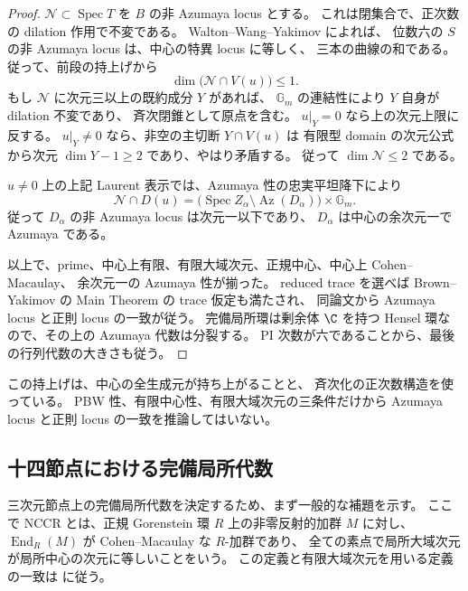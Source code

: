 \begin{proof}
$\mathcal N\subset\operatorname{Spec}T$ を $B$ の非 Azumaya locus とする。
これは閉集合で、正次数の dilation 作用で不変である。
Walton--Wang--Yakimov
\cite[Theorem~1.3(1), Lemma~5.4]{CMOWaltonWangYakimov}によれば、
位数六の $S$ の非 Azumaya locus は、中心の特異 locus に等しく、
三本の曲線の和である。従って、前段の持上げから
\[
 \dim\bigl(\mathcal N\cap V(u)\bigr)\leq1.
\]
もし $\mathcal N$ に次元三以上の既約成分 $Y$ があれば、
$\mathbb G_m$ の連結性により $Y$ 自身が dilation 不変であり、
斉次閉錐として原点を含む。
$u|_Y=0$ なら上の次元上限に反する。
$u|_Y\ne0$ なら、非空の主切断 $Y\cap V(u)$ は
有限型 domain の次元公式から次元 $\dim Y-1\geq2$ であり、やはり矛盾する。
従って $\dim\mathcal N\leq2$ である。

$u\ne0$ 上の上記 Laurent 表示では、Azumaya 性の忠実平坦降下により
\[
 \mathcal N\cap D(u)=
       \bigl(\operatorname{Spec}Z_\alpha\setminus
                     \operatorname{Az}(D_\alpha)\bigr)\times\mathbb G_m.
\]
従って $D_\alpha$ の非 Azumaya locus は次元一以下であり、
$D_\alpha$ は中心の余次元一で Azumaya である。

以上で、prime、中心上有限、有限大域次元、正規中心、中心上 Cohen--Macaulay、
余次元一の Azumaya 性が揃った。
reduced trace を選べば Brown--Yakimov の Main Theorem の trace 仮定も満たされ、
同論文\cite[Corollary~5.2]{CMOBrownYakimov}から
Azumaya locus と正則 locus の一致が従う。
完備局所環は剰余体 $\C$ を持つ Hensel 環なので、その上の Azumaya 代数は分裂する。
PI 次数が六であることから、最後の行列代数の大きさも従う。
\end{proof}

\begin{remark}
この持上げは、中心の全生成元が持ち上がることと、
斉次化の正次数構造を使っている。
PBW 性、有限中心性、有限大域次元の三条件だけから
Azumaya locus と正則 locus の一致を推論してはいない。
\end{remark}


\subsection{十四節点における完備局所代数}

三次元節点上の完備局所代数を決定するため、まず一般的な補題を示す。
ここで NCCR とは、正規 Gorenstein 環 $R$ 上の非零反射的加群 $M$ に対し、
$\operatorname{End}_R(M)$ が Cohen--Macaulay な $R$-加群であり、
全ての素点で局所大域次元が局所中心の次元に等しいことをいう。
この定義と有限大域次元を用いる定義の一致は
\cite[Definition~1.7 and Lemma~2.23]{CMOIyamaWemyssMM} に従う。

